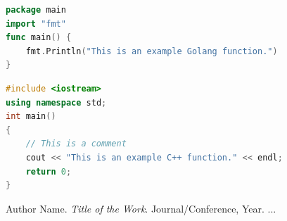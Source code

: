 \documentclass[12pt]{report}
\begin{document}
\begin{lstlisting}[language=Go, caption={Golang Code Snippet}]
package main
import "fmt"
func main() {
    fmt.Println("This is an example Golang function.")
}
\end{lstlisting}

\begin{lstlisting}[language=C++, caption={C++ Code Snippet}]
#include <iostream>
using namespace std;
int main()
{
    // This is a comment
    cout << "This is an example C++ function." << endl;
    return 0;
}
\end{lstlisting}

\newpage
{}
{}
\renewcommand{\bibname}{References}
\begin{thebibliography}{99}
     Author Name. \textit{Title of the Work}. Journal/Conference, Year.
     ...
\end{thebibliography}
\end{document}
